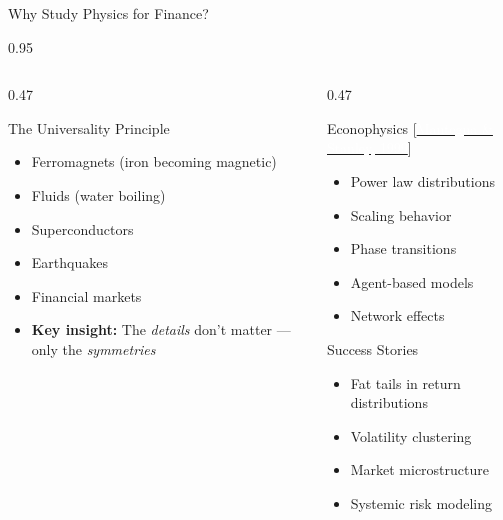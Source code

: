 \documentclass[9pt, aspectratio=169, t]{beamer}
\begin{document}
\begin{frame}{Why Study Physics for Finance?}
    \begin{cminipage}{0.95\textwidth}
    {\footnotesize
    \begin{columns}[T]
        \begin{column}{0.47\textwidth}
            \begin{block}{The Universality Principle}
                \begin{itemize}\setlength{\itemsep}{0pt}
                    \item Ferromagnets (iron becoming magnetic)
                    \item Fluids (water boiling)
                    \item Superconductors
                    \item Earthquakes
                    \item Financial markets
                    \item \textbf{Key insight:} The \textit{details} don't matter --- only the \textit{symmetries}
                \end{itemize}
            \end{block}
        \end{column}
        \begin{column}{0.47\textwidth}
            \begin{alertblock}{Econophysics {\scriptsize[\href{https://doi.org/10.1017/CBO9780511755767}{\textcolor{white}{Mantegna \& Stanley, 1999}}]}}
                \begin{itemize}\setlength{\itemsep}{0pt}
                    \item Power law distributions
                    \item Scaling behavior
                    \item Phase transitions
                    \item Agent-based models
                    \item Network effects
                \end{itemize}
            \end{alertblock}

            \begin{exampleblock}{Success Stories}
                \begin{itemize}\setlength{\itemsep}{0pt}
                    \item Fat tails in return distributions
                    \item Volatility clustering
                    \item Market microstructure
                    \item Systemic risk modeling
                \end{itemize}
            \end{exampleblock}
        \end{column}
    \end{columns}
    }
    \end{cminipage}
\end{frame}
\end{document}
